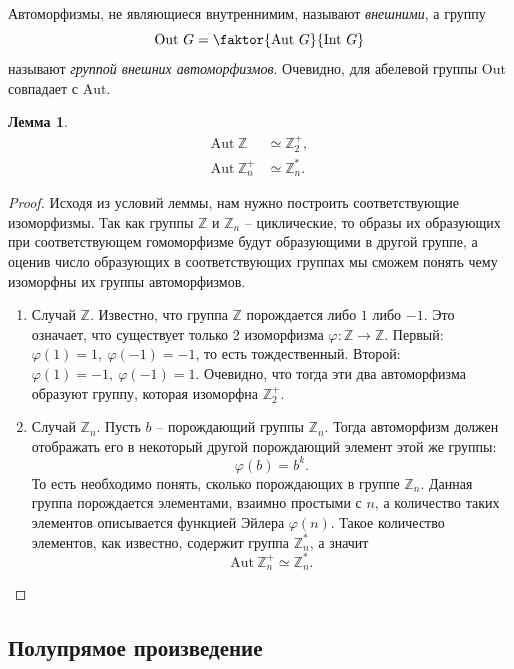 \documentclass{article}
\newtheorem{lemma}{Лемма}[section]
\begin{document}
Автоморфизмы, не являющиеся внутреннимим, называют \textit{внешними}, а группу $$ \mathrm{Out} \ G = \faktor{\mathrm{Aut} \ G}{\mathrm{Int} \ G} $$ называют \textit{группой внешних автоморфизмов}. Очевидно, для абелевой группы $\mathrm{Out}$ совпадает с $\mathrm{Aut}$.

\begin{lemma} \label{l3162}
    \begin{align*}
        \mathrm{Aut} \ \mathbb{Z} &\simeq \mathbb{Z}_2^+, \\
        \mathrm{Aut} \ \mathbb{Z}_n^+ &\simeq \mathbb{Z}_n^*.
    \end{align*}
\end{lemma}
\begin{proof}
    Исходя из условий леммы, нам нужно построить соответствующие изоморфизмы.
    Так как группы $\mathbb{Z}$ и $\mathbb{Z}_n$ -- циклические, то образы их образующих при соответствующем гомоморфизме будут образующими в другой группе, а оценив число образующих в соответствующих группах мы сможем понять чему изоморфны их группы автоморфизмов.
    \begin{enumerate}
        \item Случай $\mathbb{Z}$. Известно, что группа $\mathbb{Z}$ порождается либо $1$ либо $-1$. Это означает, что существует только 2 изоморфизма $\varphi: \mathbb{Z} \rightarrow \mathbb{Z}$. Первый: $\varphi(1) = 1, \ \varphi(-1) = -1$, то есть тождественный. Второй: $\varphi(1) = -1, \ \varphi(-1) = 1$. Очевидно, что тогда эти два автоморфизма образуют группу, которая изоморфна $\mathbb{Z}_2^+$.

        \item Случай $\mathbb{Z}_n$. Пусть $b$ -- порождающий группы $\mathbb{Z}_n$. Тогда автоморфизм должен отображать его в некоторый другой порождающий элемент этой же группы:
        \[
            \varphi(b) = b^k.
        \]
         То есть необходимо понять, сколько порождающих в группе $\mathbb{Z}_n$. Данная группа порождается элементами, взаимно простыми с $n$, а количество таких элементов описывается функцией Эйлера $\varphi(n)$. Такое количество элементов, как известно, содержит группа $\mathbb{Z}_n^*$, а значит
         \[
            \mathrm{Aut} \ \mathbb{Z}_n^+ \simeq \mathbb{Z}_n^*.
         \]
    \end{enumerate}
\end{proof}

\subsection{Полупрямое произведение}
\end{document}
